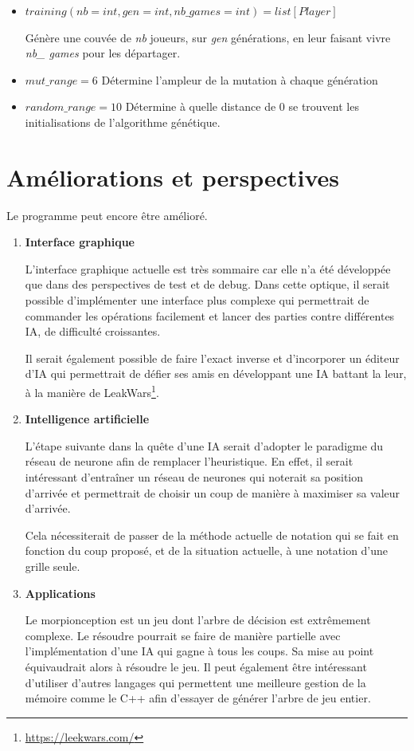\documentclass[10pt, french]{article}
\begin{document}
\begin{itemize}
\item $training(nb=int, gen= int, nb\_games=int)=list[Player]$ \par Génère une couvée de \emph{nb} joueurs, sur \emph{gen} générations, en leur faisant vivre \emph{nb\_ games} pour les départager.
\item $mut\_range = 6$ \qquad Détermine l'ampleur de la mutation à chaque génération
\item $random\_range = 10$ \quad Détermine à quelle distance de $0$ se trouvent les initialisations de l'algorithme génétique.
\end{itemize}

\paragraph{}
\section{Améliorations et perspectives}
Le programme peut encore être amélioré.
    \begin{enumerate}

\item \textbf{Interface graphique} 

L'interface graphique actuelle est très sommaire car elle n'a été développée que dans des perspectives de test et de debug. Dans cette optique, il serait possible d'implémenter une interface plus complexe qui permettrait de commander les opérations facilement et lancer des parties contre différentes IA, de difficulté croissantes.
\par Il serait également possible de faire l'exact inverse et d'incorporer un éditeur d'IA qui permettrait de défier ses amis en développant une IA battant la leur, à la manière de LeakWars\footnote{\url{https://leekwars.com/}}.

\item \textbf{Intelligence artificielle} 

L'étape suivante dans la quête d'une IA serait d'adopter le paradigme du réseau de neurone afin de remplacer l'heuristique. En effet, il serait intéressant d'entraîner un réseau de neurones qui noterait sa position d'arrivée et permettrait de choisir un coup de manière à maximiser sa valeur d'arrivée.
\par Cela nécessiterait de passer de la méthode actuelle de notation qui se fait en fonction du coup proposé, et de la situation actuelle, à une notation d'une grille seule.

\item \textbf{Applications} 
\par Le morpionception est un jeu dont l'arbre de décision est extrêmement complexe. Le résoudre pourrait se faire de manière partielle avec l’implémentation d'une IA qui gagne à tous les coups. Sa mise au point équivaudrait alors à résoudre le jeu. Il peut également être intéressant d'utiliser d'autres langages qui permettent une meilleure gestion de la mémoire comme le C++ afin d'essayer de générer l'arbre de jeu entier.

\end{enumerate}
\end{document}

